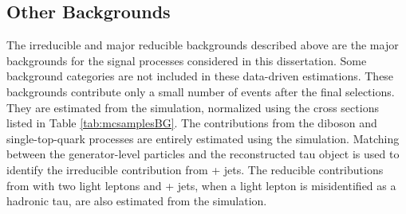 \subsection{Other Backgrounds}

The \ttbar irreducible and major reducible backgrounds described above are the major backgrounds for the signal processes considered in this dissertation. Some background categories are not included in these data-driven estimations. These backgrounds contribute only a small number of events after the final selections. They are estimated from the simulation, normalized using the cross sections listed in Table \ref{tab:mcsamplesBG}. The contributions from the diboson and single-top-quark processes are entirely estimated using the simulation. Matching between the generator-level particles and the reconstructed tau object is used to identify the irreducible contribution from \Ztt + jets. The reducible contributions from \ttbar with two light leptons and \Zll + jets, when a light lepton is misidentified as a hadronic tau, are also estimated from the simulation.